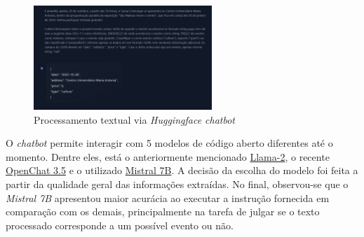 \begin{figure}[h]
    \centering
    \includegraphics[width=0.6\textwidth]{figuras/huggingface-chatbot2.png}
    \caption{Processamento textual via \textit{Huggingface chatbot}}
    \label{fig:enter-label}
\end{figure}

O \textit{chatbot} permite interagir com 5 modelos de código aberto diferentes
até o momento. Dentre eles, está o anteriormente mencionado
\href{https://ai.meta.com/llama/}{Llama-2}, o recente
\href{https://github.com/imoneoi/openchat}{OpenChat 3.5} e o utilizado
\href{https://mistral.ai/news/announcing-mistral-7b/}{Mistral 7B}. A decisão da
escolha do modelo foi feita a partir da qualidade geral das informações
extraídas. No final, observou-se que o \textit{Mistral 7B} apresentou maior
acurácia ao executar a instrução fornecida em comparação com os demais,
principalmente na tarefa de julgar se o texto processado corresponde a um
possível evento ou não.

